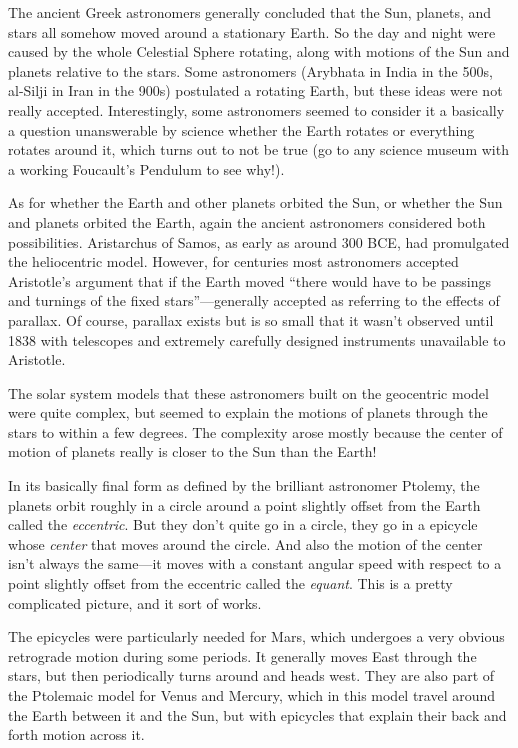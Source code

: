 \documentclass[12pt, preprint]{aastex}
\begin{document}
The ancient Greek astronomers generally concluded that the Sun,
planets, and stars all somehow moved around a stationary Earth. So the
day and night were caused by the whole Celestial Sphere rotating,
along with motions of the Sun and planets relative to the stars. Some
astronomers (Arybhata in India in the 500s, al-Silji in Iran in the
900s) postulated a rotating Earth, but these ideas were not really
accepted. Interestingly, some astronomers seemed to consider it a
basically a question unanswerable by science whether the Earth rotates
or everything rotates around it, which turns out to not be true (go to
any science museum with a working Foucault's Pendulum to see why!).

As for whether the Earth and other planets orbited the Sun, or whether
the Sun and planets orbited the Earth, again the ancient astronomers
considered both possibilities. Aristarchus of Samos, as early as
around 300 BCE, had promulgated the heliocentric model. However, for
centuries most astronomers accepted Aristotle's argument that if the
Earth moved ``there would have to be passings and turnings of the
fixed stars''---generally accepted as referring to the effects of
parallax. Of course, parallax exists but is so small that it wasn't
observed until 1838 with telescopes and extremely carefully designed
instruments unavailable to Aristotle. 

The solar system models that these astronomers built on the geocentric
model were quite complex, but seemed to explain the motions of planets
through the stars to within a few degrees. The complexity arose
mostly because the center of motion of planets really is closer to the
Sun than the Earth! 

In its basically final form as defined by the brilliant astronomer
Ptolemy, the planets orbit roughly in a circle around a point slightly
offset from the Earth called the {\it eccentric}. But they don't quite
go in a circle, they go in a epicycle whose {\it center} that moves
around the circle.  And also the motion of the center isn't always the
same---it moves with a constant angular speed with respect to a point
slightly offset from the eccentric called the {\it equant}. This is a
pretty complicated picture, and it sort of works.

The epicycles were particularly needed for Mars, which undergoes a
very obvious retrograde motion during some periods. It generally moves
East through the stars, but then periodically turns around and heads
west. They are also part of the Ptolemaic model for Venus and Mercury,
which in this model travel around the Earth between it and the Sun,
but with epicycles that explain their back and forth motion across it.
\end{document}
